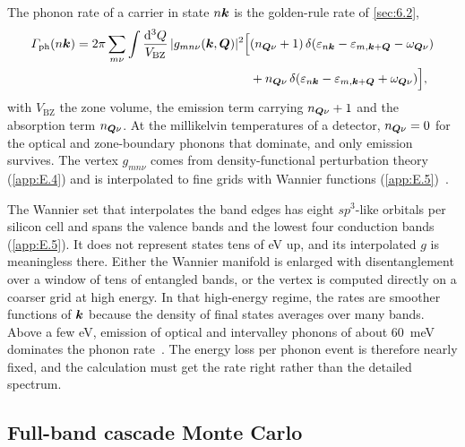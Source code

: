 The phonon rate of a carrier in state $n\bm{k}$ is the golden-rule rate of \cref{sec:6.2},
\begin{equation}
  \begin{split}
  \varGamma_{\mathrm{ph}}(n\bm{k}) = 2\pi\sum_{m\nu}\int\frac{\mathrm{d}^3Q}{V_{\mathrm{BZ}}}\,|g_{mn\nu}(\bm{k}, \bm{Q})|^2
  \Bigl[&(n_{\bm{Q}\nu} + 1)\,\delta(\varepsilon_{n\bm{k}} - \varepsilon_{m,\bm{k}+\bm{Q}} - \omega_{\bm{Q}\nu})\\ &+ n_{\bm{Q}\nu}\,\delta(\varepsilon_{n\bm{k}} - \varepsilon_{m,\bm{k}+\bm{Q}} + \omega_{\bm{Q}\nu})\Bigr],
  \end{split}
  \label{eq:E.13-gph}
\end{equation}
with $V_{\mathrm{BZ}}$ the zone volume, the emission term carrying $n_{\bm{Q}\nu} + 1$ and the absorption term $n_{\bm{Q}\nu}$. At the millikelvin temperatures of a detector, $n_{\bm{Q}\nu} = 0$ for the optical and zone-boundary phonons that dominate, and only emission survives. The vertex $g_{mn\nu}$ comes from density-functional perturbation theory (\cref{app:E.4}) and is interpolated to fine grids with Wannier functions (\cref{app:E.5})~\cite{ponce2016epw,giustino2017electron}.

The Wannier set that interpolates the band edges has eight $sp^3$-like orbitals per silicon cell and spans the valence bands and the lowest four conduction bands (\cref{app:E.5}). It does not represent states tens of eV up, and its interpolated $g$ is meaningless there. Either the Wannier manifold is enlarged with disentanglement over a window of tens of entangled bands, or the vertex is computed directly on a coarser grid at high energy. In that high-energy regime, the rates are smoother functions of $\bm{k}$ because the density of final states averages over many bands. Above a few eV, emission of optical and intervalley phonons of about \SI{60}{meV} dominates the phonon rate~\cite[Sect.~II\,B]{ramanathan2020ionization}. The energy loss per phonon event is therefore nearly fixed, and the calculation must get the rate right rather than the detailed spectrum.

\subsection{Full-band cascade Monte Carlo}

